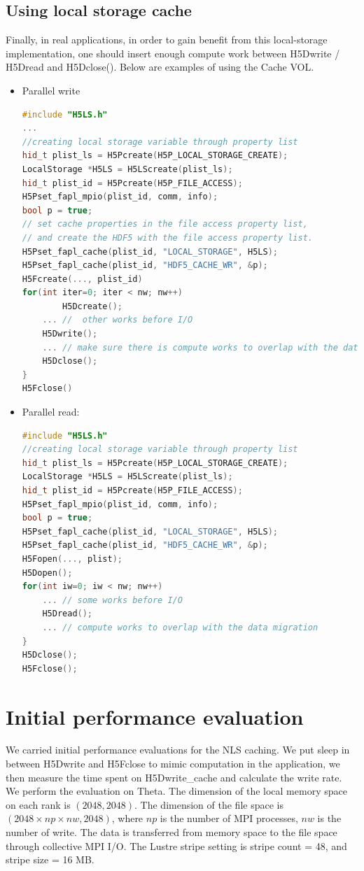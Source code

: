 \documentclass[aps, rmp, 11pt, notitlepage]{revtex4-1}
\begin{document}
\subsection{Using local storage cache}
Finally, in real applications, in order to gain benefit from this local-storage implementation,  one should insert enough compute work between H5Dwrite /  H5Dread and H5Dclose(). Below are examples of using the Cache VOL.
\begin{itemize}
\item Parallel write 
\begin{lstlisting}[language=C++]
#include "H5LS.h"
...
//creating local storage variable through property list
hid_t plist_ls = H5Pcreate(H5P_LOCAL_STORAGE_CREATE); 
LocalStorage *H5LS = H5LScreate(plist_ls);
hid_t plist_id = H5Pcreate(H5P_FILE_ACCESS);
H5Pset_fapl_mpio(plist_id, comm, info);
bool p = true;
// set cache properties in the file access property list, 
// and create the HDF5 with the file access property list.
H5Pset_fapl_cache(plist_id, "LOCAL_STORAGE", H5LS);
H5Pset_fapl_cache(plist_id, "HDF5_CACHE_WR", &p);
H5Fcreate(..., plist_id)
for(int iter=0; iter < nw; nw++)
        H5Dcreate(); 
	... //  other works before I/O
	H5Dwrite(); 
	... // make sure there is compute works to overlap with the data migration
	H5Dclose();
}
H5Fclose()
\end{lstlisting}
\item Parallel read: 
\begin{lstlisting}[language=C++]
#include "H5LS.h"
//creating local storage variable through property list
hid_t plist_ls = H5Pcreate(H5P_LOCAL_STORAGE_CREATE);
LocalStorage *H5LS = H5LScreate(plist_ls);
hid_t plist_id = H5Pcreate(H5P_FILE_ACCESS);
H5Pset_fapl_mpio(plist_id, comm, info);
bool p = true;
H5Pset_fapl_cache(plist_id, "LOCAL_STORAGE", H5LS);
H5Pset_fapl_cache(plist_id, "HDF5_CACHE_WR", &p);
H5Fopen(..., plist);
H5Dopen();
for(int iw=0; iw < nw; nw++)
	... // some works before I/O
	H5Dread();
	... // compute works to overlap with the data migration
}
H5Dclose();
H5Fclose();
\end{lstlisting}
\end{itemize}


\section{Initial performance evaluation}
\label{sec:benchmarks}
We carried initial performance evaluations for the NLS caching. We put sleep in between H5Dwrite and H5Fclose to mimic computation in the application, we then measure the time spent on H5Dwrite\_cache and calculate the write rate. We perform the evaluation on Theta. The dimension of the local memory space on each rank is $(2048, 2048)$. The dimension of the file space is $(2048\times np\times nw, 2048)$, where $np$ is the number of MPI processes, $nw$ is the number of write. The data is transferred from memory space to the file space through collective MPI I/O. The Lustre stripe setting is stripe count = 48, and stripe size = 16 MB. 
\end{document}
